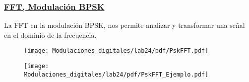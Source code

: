 \begin{frame}
   
  \frametitle{\underline{\textbf{FFT, Modulación BPSK}}}
   \begin{flushleft}
  La FFT en la modulación BPSK, nos permite analizar y transformar una señal en el dominio de la frecuencia.
   \end{flushleft}
   \begin{figure}[H]
    \centering
    \vspace{-3mm}
   \texttt{[image: Modulaciones\_digitales/lab24/pdf/PskFFT.pdf]}  
   \end{figure}
 \end{frame}

\begin{frame}
\begin{figure}[H]
\centering
\vspace{-3mm}
\texttt{[image: Modulaciones\_digitales/lab24/pdf/PskFFT\_Ejemplo.pdf]}   
\end{figure}
\end{frame}
  
